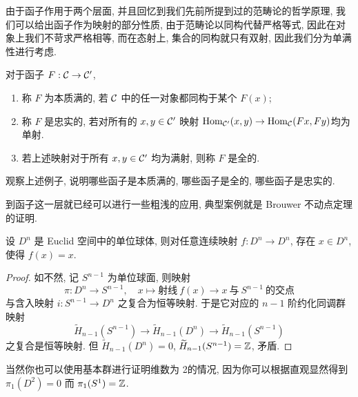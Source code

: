 由于函子作用于两个层面, 并且回忆到我们先前所提到过的范畴论的哲学原理, 我们可以给出函子作为映射的部分性质, 由于范畴论以同构代替严格等式, 因此在对象上我们不苛求严格相等, 而在态射上, 集合的同构就只有双射, 因此我们分为单满性进行考虑.
\begin{definition}
    对于函子 $F: \cal{C} \to \cal{C}'$,
    \begin{enumerate}
        \item 称 $F$ 为本质满的, 若 $\cal{C}$ 中的任一对象都同构于某个 $F(x)$;
        \item 称 $F$ 是忠实的, 若对所有的 $x,y \in \cal{C}'$ 映射 $\operatorname{Hom}_{\cal{C}'}(x,y) \to \operatorname{Hom}_{\cal{C}}(Fx,Fy)$均为单射.
        \item 若上述映射对于所有 $x,y \in \cal{C}'$ 均为满射, 则称 $F$ 是全的.
    \end{enumerate}
\end{definition}
\begin{exercise}
    观察上述例子, 说明哪些函子是本质满的, 哪些函子是全的, 哪些函子是忠实的.
\end{exercise}
到函子这一层就已经可以进行一些粗浅的应用, 典型案例就是 Brouwer 不动点定理的证明.
\begin{theorem}\label{定理:Brouwer}
    设 $D^n$ 是 Euclid 空间中的单位球体,
    则对任意连续映射 $f \colon D^n \to D^n$,
    存在 $x \in D^n$, 使得 $f(x) = x$.
\end{theorem}
\begin{proof}
    如不然, 记 $S^{n-1}$ 为单位球面, 则映射
    \[
        \pi \colon D^n \to S^{n-1}, \quad
        x \mapsto \text{射线}\ f(x) \to x\ \text{与}\ S^{n-1}\ \text{的交点}
    \]
    与含入映射 $i \colon S^{n-1} \to D^n$ 之复合为恒等映射.
    于是它对应的 $n-1$ 阶约化同调群映射 
    \[
        \widetilde H_{n-1}(S^{n-1}) \to
        \widetilde H_{n-1}(D^n) \to
        \widetilde H_{n-1}(S^{n-1})
    \]
    之复合是恒等映射. 但 $\widetilde H_{n-1}(D^n) = 0$, 
    $\widetilde H_{n-1}(S^{n-1}) = \mathbb{Z}$, 矛盾.
\end{proof}
当然你也可以使用基本群进行证明维数为 2的情况, 因为你可以根据直观显然得到 $\pi_1(D^2) = 0$ 而 $\pi_1(S^1) = \mathbb{Z}$.
